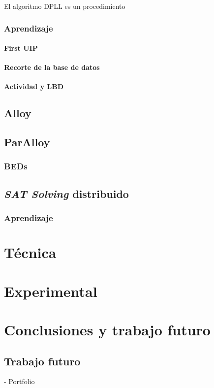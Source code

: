\documentclass[a4paper, 11pt, twoside]{tesis}
\begin{document}
El algoritmo DPLL es un procedimiento 

\subsection{Aprendizaje}
\subsubsection{First UIP}
\subsubsection{Recorte de la base de datos}
\subsubsection{Actividad y LBD}

\section{Alloy}

\section{ParAlloy}
\subsection{BEDs}

\section{\emph{SAT Solving} distribuido}

\subsection{Aprendizaje}

\chapter{Técnica}



\chapter{Experimental}

\chapter{Conclusiones y trabajo futuro}

\section{Trabajo futuro}
- Portfolio

{}

\end{document}
